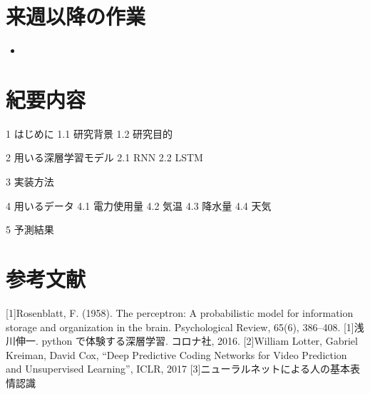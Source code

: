 \section{来週以降の作業}
\begin{itemize}
         \item 
\end{itemize}

\section{紀要内容}
1 はじめに
1.1 研究背景
1.2 研究目的

2 用いる深層学習モデル
2.1 RNN
2.2 LSTM

3 実装方法

4 用いるデータ
4.1 電力使用量
4.2 気温
4.3 降水量
4.4 天気

5 予測結果

\section{参考文献}
[1]Rosenblatt, F. (1958). The perceptron: A probabilistic model for information storage and organization in the brain. Psychological Review, 65(6), 386–408.
[1]浅川伸一. python で体験する深層学習. コロナ社, 2016.
[2]William Lotter, Gabriel Kreiman, David Cox, “Deep Predictive Coding Networks for Video Prediction and Unsupervised Learning”, ICLR, 2017
[3]ニューラルネットによる人の基本表情認識 



